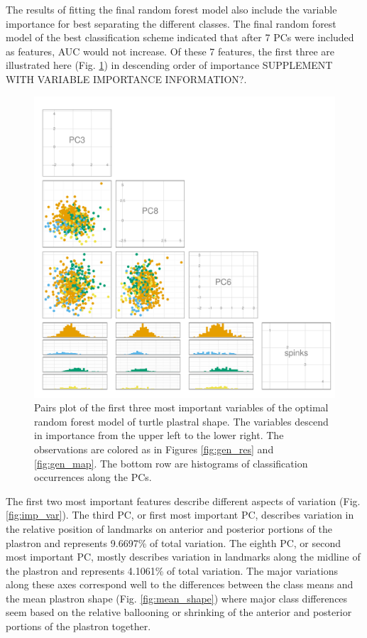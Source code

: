 \documentclass[12pt,letterpaper]{article}\usepackage{graphicx, color}
\begin{document}
The results of fitting the final random forest model also include the variable importance for best separating the different classes. The final random forest model of the best classification scheme indicated that after 7 PCs were included as features, AUC would not increase. Of these 7 features, the first three are illustrated here (Fig. \ref{fig:imp_pc}) in descending order of importance SUPPLEMENT WITH VARIABLE IMPORTANCE INFORMATION?. 

\begin{figure}[ht]
  \centering
  \includegraphics[width = \textwidth]{figure/pca_imp}
  \caption{Pairs plot of the first three most important variables of the optimal random forest model of turtle plastral shape. The variables descend in importance from the upper left to the lower right. The observations are colored as in Figures \ref{fig:gen_res} and \ref{fig:gen_map}.  The bottom row are histograms of classification occurrences along the PCs.}
  \label{fig:imp_pc}
\end{figure}

The first two most important features describe different aspects of variation (Fig. \ref{fig:imp_var}). The third PC, or first most important PC, describes variation in the relative position of landmarks on anterior and posterior portions of the plastron and represents 9.6697\% of total variation. The eighth PC, or second most important PC, mostly describes variation in landmarks along the midline of the plastron and represents 4.1061\% of total variation. The major variations along these axes correspond well to the differences between the class means and the mean plastron shape (Fig. \ref{fig:mean_shape}) where major class differences seem based on the relative ballooning or shrinking of the anterior and posterior portions of the plastron together.
\end{document}
